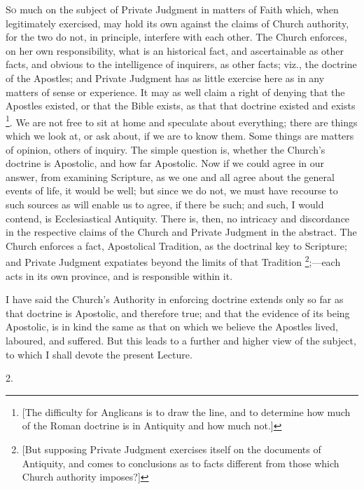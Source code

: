 
S\textsc{o} much on the subject of Private Judgment in matters of
Faith which, when legitimately exercised, may hold its own against the
claims of Church authority, for the two do not, in principle,
interfere with each other. The Church enforces, on her own
responsibility, what is an historical fact, and ascertainable as other
facts, and obvious to the intelligence of inquirers, as other facts;
viz., the doctrine of the Apostles; and Private Judgment has as little
exercise here as in any matters of sense or experience. It may as well
claim a right of denying that the Apostles existed, or that the Bible
exists, as that that doctrine existed and exists \footnote{[The difficulty for Anglicans is to draw the line, and to
determine how much of the Roman doctrine is in Antiquity and how much
not.]}. We are not free to sit at home and speculate about everything;
there are things which we look at, or ask about, if we are to know
them. Some things are matters of opinion, others of inquiry. The
simple question is, whether the Church's doctrine is Apostolic, and
how far Apostolic. Now if we could agree in our answer, from examining
Scripture, as we one and all agree about the general events of life,
it would be well; but since we do not, we must have recourse to such
sources as will enable us to agree, if there be such; and such, I would
contend, is Ecclesiastical Antiquity. There is, then, no
intricacy and discordance in the respective claims of the Church and
Private Judgment in the abstract. The Church enforces a fact,
Apostolical Tradition, as the doctrinal key to Scripture; and Private
Judgment expatiates beyond the limits of that Tradition \footnote{[But supposing Private Judgment exercises
itself on the documents of Antiquity, and comes to conclusions as to
facts different from those which Church authority imposes?]};—each acts in its own province, and is responsible within it.

I have said the Church's Authority in enforcing doctrine extends
only so far as that doctrine is Apostolic, and therefore true; and
that the evidence of its being Apostolic, is in kind the same as that
on which we believe the Apostles lived, laboured, and suffered. But
this leads to a further and higher view of the subject, to which I
shall devote the present Lecture.

2.

